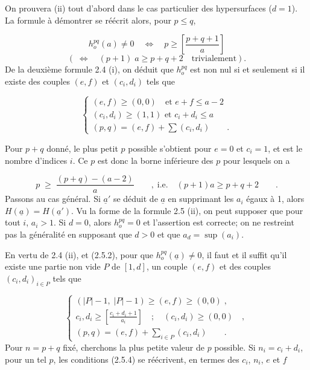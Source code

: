 On prouvera (ii) tout d'abord dans le cas particulier des hypersurfaces ($d = 1$). La formule à démontrer se réécrit alors, pour $p \leqslant q$,

\begin{equation}\tag{2.5.2}
h_o^{pq}(a) \neq 0 \quad \Longleftrightarrow \quad p \geqslant \left[\frac{p+q+1}{a}\right]
\end{equation}
\begin{equation*}
(\; \Longleftrightarrow \quad (p+1) \; a \geqslant p+q+2 \quad \mbox{trivialement}).
\end{equation*}
De la deuxième formule 2.4 (i), on déduit que $h_o^{pq}$ est non nul si et seulement si il existe des couples $(e,f)$ et $(c_i,d_i)$ tels que

\begin{equation}\tag{2.5.3}
\left\{
\begin{array}{l}
(e,f) \geqslant (0,0) \quad \mbox{et } e+f \leqslant a-2 \\[3mm]
(c_i,d_i) \geqslant (1,1) \mbox{ et } c_i+d_i \leqslant a \\[3mm]
(p,q) = (e,f) + \sum (c_i,d_i) \qquad .
\end{array}
\right.
\end{equation}


Pour $p+q$ donné, le plus petit $p$ possible s'obtient pour $e = 0$ et $c_i = 1$, et est le nombre d'indices $i$. Ce $p$ est donc la borne inférieure des $p$ pour lesquels on a

\begin{equation*}
p \;\geqslant\; \frac{(p+q)-(a-2)}{a} \qquad , \; \mbox{i.e.} \quad (p+1)a \geqslant p+q+2 \qquad .
\end{equation*}
Passons au cas général. Si $\underline{a}'$ se déduit de $\underline{a}$ en supprimant les $a_i$ égaux à 1, alors $H(\underline{a}) = H(\underline{a}')$. Vu la forme de la formule 2.5 (ii), on peut supposer que pour tout $i$, $a_i > 1$. Si $d = 0$, alors $h_o^{pq} = 0$ et l'assertion est correcte; on ne restreint pas la généralité en supposant que $d > 0$ et que $a_d = \sup(a_i)$.

En vertu de 2.4 (ii), et (2.5.2), pour que $h_o^{pq}(\underline{a}) \neq 0$, il faut et il suffit qu'il existe une partie non vide $P$ de $[1,d]$, un couple $(e,f)$ et des couples $(c_i,d_i)_{i\in P}$ tels que

\begin{equation}\tag{2.5.4}
\left\{
\begin{array}{l}
(|P|-1, \; |P|-1) \geqslant (e,f) \geqslant (0,0) \; , \\[3mm]
c_i,d_i \geqslant \left[{\displaystyle \frac{c_i+d_i+1}{a_i}}\right] \quad ; \quad (c_i,d_i) \geqslant (0,0) \quad , \\[3mm]
(p,q) = (e,f) + \sum_{i\in P} (c_i,d_i) \qquad .
\end{array}
\right.
\end{equation}
Pour $n = p+q$ fixé, cherchons la plus petite valeur de $p$ possible. Si $n_i = c_i + d_i$, pour un tel $p$, les conditions (2.5.4) se réécrivent, en termes des $c_i$, $n_i$, $e$ et $f$ 


